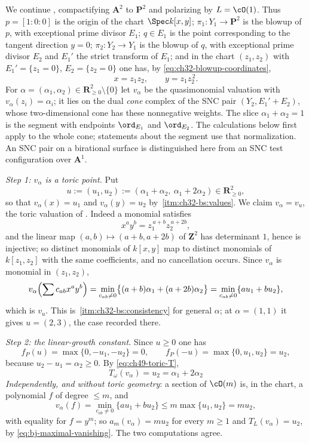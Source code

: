 \begin{example}
\label{ex:ch49-blowup-surface}
We continue , compactifying $\mathbf A^2$ to
$\mathbf P^2$ and polarizing by $L=\cO(1)$.  Thus
$p=[1:0:0]$ is the origin of the chart $\Spec k[x,y]$;
$\pi_1:Y_1\to\mathbf P^2$ is the blowup of $p$, with exceptional prime
divisor $E_1$; $q\in E_1$ is the point corresponding to the tangent
direction $y=0$; $\pi_2:Y_2\to Y_1$ is the blowup of $q$, with
exceptional prime divisor $E_2$ and $E_1'$ the strict transform of
$E_1$; and in the chart $(z_1,z_2)$ with $E_1'=\{z_1=0\}$,
$E_2=\{z_2=0\}$ one has, by \eqref{eq:ch32-blowup-coordinates},
\[
 x=z_1z_2,\qquad y=z_1z_2^{\,2}.
\]
For $\alpha=(\alpha_1,\alpha_2)\in\mathbf R^2_{\ge0}\setminus\{0\}$ let
$v_\alpha$ be the quasimonomial valuation with
$v_\alpha(z_i)=\alpha_i$; it lies on the dual \emph{cone} complex of the SNC pair
$(Y_2,E_1'+E_2)$, whose two-dimensional cone has these nonnegative
weights.  The slice $\alpha_1+\alpha_2=1$ is the segment with endpoints
$\ord_{E_1}$ and $\ord_{E_2}$.  The calculations below first apply to
the whole cone; statements about the segment use that normalization.
An SNC pair on a birational surface is distinguished here from an
SNC test configuration over $\mathbf A^1$.

\emph{Step 1: $v_\alpha$ is a toric point.}  Put
\[
 u:=(u_1,u_2):=(\alpha_1+\alpha_2,\ \alpha_1+2\alpha_2)
 \in\mathbf R^2_{\ge0},
\]
so that $v_\alpha(x)=u_1$ and $v_\alpha(y)=u_2$ by
\,\cref{itm:ch32-bs:values}.  We claim
$v_\alpha=v_u$, the toric valuation of
.  Indeed a monomial satisfies
\[
 x^ay^b=z_1^{\,a+b}z_2^{\,a+2b},
\]
and the linear map $(a,b)\mapsto(a+b,a+2b)$ of $\mathbf Z^2$ has
determinant $1$, hence is injective; so distinct monomials of
$k[x,y]$ map to distinct monomials of $k[z_1,z_2]$ with the same
coefficients, and no cancellation occurs.  Since $v_\alpha$ is monomial
in $(z_1,z_2)$,
\[
 v_\alpha\Bigl(\sum c_{ab}x^ay^b\Bigr)
 =\min_{c_{ab}\ne0}\bigl\{(a+b)\alpha_1+(a+2b)\alpha_2\bigr\}
 =\min_{c_{ab}\ne0}\{au_1+bu_2\},
\]
which is $v_u$.  This is
\,\cref{itm:ch32-bs:consistency} for general
$\alpha$; at $\alpha=(1,1)$ it gives $u=(2,3)$, the case recorded
there.

\emph{Step 2: the linear-growth constant.}  Since $u\ge0$ one has
\[
 f_P(u)=\max\{0,-u_1,-u_2\}=0,
 \qquad
 f_P(-u)=\max\{0,u_1,u_2\}=u_2,
\]
because $u_2-u_1=\alpha_2\ge0$.  By
\eqref{eq:ch49-toric-T},
\[
 \boxed{\ T_\omega(v_\alpha)=u_2=\alpha_1+2\alpha_2\ }
\]
\emph{Independently, and without toric geometry}: a section of
$\cO(m)$ is, in the chart, a polynomial $f$ of degree $\le m$, and
\[
 v_\alpha(f)=\min_{c_{ab}\ne0}\{au_1+bu_2\}
 \le m\max\{u_1,u_2\}=mu_2 ,
\]
with equality for $f=y^m$; so $a_m(v_\alpha)=mu_2$ for every
$m\ge1$ and $T_L(v_\alpha)=u_2$, by \eqref{eq:bj-maximal-vanishing}.
The two computations agree.


\end{example}
